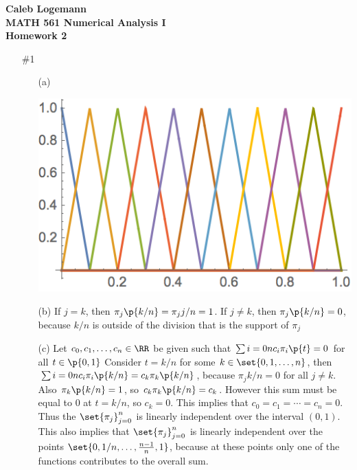 \documentclass[11pt]{article}
\begin{document}
\noindent \textbf{\Large{Caleb Logemann \\
MATH 561 Numerical Analysis I \\
Homework 2
}}

\begin{enumerate}
    \item[\#1] %
        \begin{enumerate}
            \item[(a)] \hfill \\
                \begin{center}
                    \includegraphics[scale=.5]{Figures/02_1a.png}
                \end{center}

            \item[(b)]
                If $j = k$, then $\pi_j\p{k/n} = \pi_j{j/n} = 1$.
                If $j \neq k$, then $\pi_j\p{k/n} = 0$, because $k/n$ is
                outside of the division that is the support of $\pi_j$

            \item[(c)]
                Let $c_0, c_1, \ldots, c_n \in \RR$ be given such that
                $\sum{i=0}{n}{c_i \pi_i\p{t}} = 0$ for all $t \in \p{0,1}$
                Consider $t = k/n$ for some $k \in \set{0, 1, \ldots, n}$, then
                $\sum{i=0}{n}{c_i \pi_i\p{k/n}} = c_k \pi_k\p{k/n}$, because
                $\pi_j{k/n} = 0$ for all $j \neq k$.
                Also $\pi_k\p{k/n} = 1$, so $c_k \pi_k\p{k/n} = c_k$.
                However this sum must be equal to $0$ at $t = k/n$, so $c_k = 0$.
                This implies that $c_0 = c_1 = \cdots = c_n = 0$.
                Thus the $\set{\pi_j}_{j=0}^n$ is linearly independent over the
                interval $(0, 1)$.
                This also implies that $\set{\pi_j}_{j=0}^n$ is linearly independent
                over the points $\set{0, 1/n, \ldots, \frac{n-1}{n}, 1}$, because
                at these points only one of the functions contributes to the
                overall sum.


\end{enumerate}
\end{enumerate}
\end{document}
